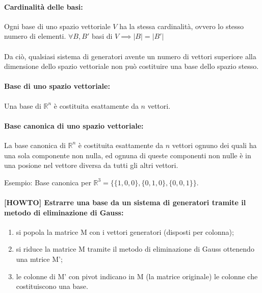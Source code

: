 \documentclass[a4paper]{article}
\begin{document}
        \paragraph{Cardinalit\`{a} delle basi:}
        Ogni base di uno spazio vettoriale $V$ ha la stessa cardinalit\`{a}, ovvero lo stesso numero di elementi.
        $\forall B,B'$ basi di $V \implies |B| = |B'|$

        \paragraph{}
        Da ci\`{o}, qualsiasi sistema di generatori avente un numero di vettori superiore alla dimensione dello spazio vettoriale non pu\`{o} costituire una base dello spazio stesso.

        \paragraph{Base di uno spazio vettoriale:}
        Una base di $\mathbb{R}^n$ \`{e} costituita esattamente da $n$ vettori.

        \paragraph{Base canonica di uno spazio vettoriale:}
        La base canonica di $\mathbb{R}^n$ \`{e} costituita esattamente da $n$ vettori ognuno dei quali ha una sola componente non nulla, ed ognuna di queste componenti non nulle \`{e} in una posione nel vettore diversa da tutti gli altri vettori.

        Esempio:
        Base canonica per $\mathbb{R}^3 = \{ \{1, 0, 0 \}, \{0, 1, 0\}, \{0, 0, 1\} \}$.

        \paragraph{[HOWTO] Estrarre una base da un sistema di generatori tramite il metodo di eliminazione di Gauss:}
        \begin{enumerate}
                \item si popola la matrice M con i vettori generatori (disposti per colonna);
                \item si riduce la matrice M tramite il metodo di eliminazione di Gauss ottenendo una mtrice M';
                \item le colonne di M' con pivot indicano in M (la matrice originale) le colonne che costituiscono una base.
        \end{enumerate}
\end{document}
